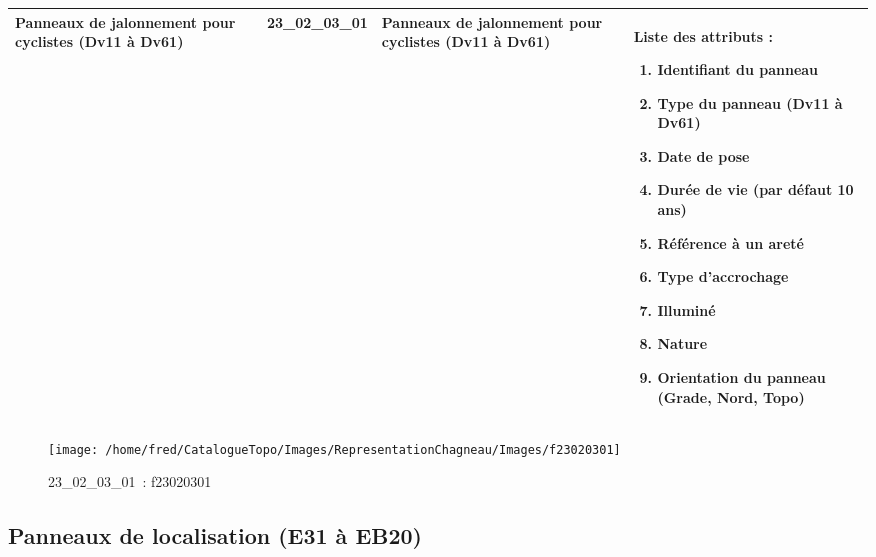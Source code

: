 \documentclass[12pt,titlepage]{book}
\begin{document}
\renewcommand{\arraystretch}{1.2}
\begin{supertabular}{|p{10cm}|c|p{13cm}|p{12cm}|}
 Panneaux de jalonnement pour cyclistes (Dv11 à Dv61) & 23\_02\_03\_01 & Panneaux de jalonnement pour cyclistes (Dv11 à Dv61) & Liste des attributs :
\begin{enumerate}
  \item Identifiant du panneau  \item Type du panneau (Dv11 à Dv61)  \item Date de pose  \item Durée de vie (par défaut 10 ans)  \item Référence à un areté  \item Type d'accrochage  \item Illuminé  \item Nature  \item Orientation du panneau (Grade, Nord, Topo)\end{enumerate}
\\
\hline
\end{supertabular}
\begin{figure}[h!]
  \hfill         %
  \begin{minipage}[t]{3cm}
    \begin{center}
      \texttt{[image: /home/fred/CatalogueTopo/Images/RepresentationChagneau/Images/f23020301]}
      \caption[~23\_02\_03\_01]{\small{23\_02\_03\_01~:} \tiny{f23020301}}\label{f23020301}
    \end{center}
  \end{minipage}
\end{figure}


\subsection{Panneaux de localisation (E31 à EB20)}
\noindent
\vspace{\baselineskip}
\end{document}
